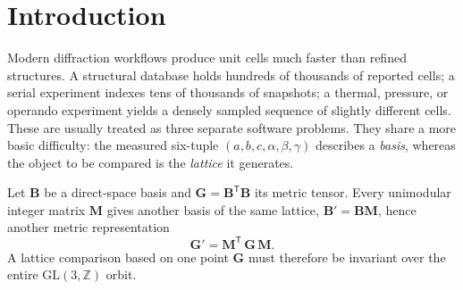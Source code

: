 \documentclass[11pt]{article}
\newcommand{\Gmet}{\mathbf{G}}
\newcommand{\Mop}{\mathbf{M}}
\newcommand{\Bbasis}{\mathbf{B}}
\begin{document}
\section{Introduction}

Modern diffraction workflows produce unit cells much faster than refined
structures. A structural database holds hundreds of thousands of reported cells;
a serial experiment indexes tens of thousands of snapshots; a thermal, pressure,
or operando experiment yields a densely sampled sequence of slightly different
cells. These are usually treated as three separate software problems. They share
a more basic difficulty: the measured six-tuple
$(a, b, c, \alpha, \beta, \gamma)$ describes a \emph{basis}, whereas the object
to be compared is the \emph{lattice} it generates.

Let $\Bbasis$ be a direct-space basis and $\Gmet = \Bbasis^{\mathsf T}\Bbasis$
its metric tensor. Every unimodular integer matrix $\Mop$ gives another basis of
the same lattice, $\Bbasis' = \Bbasis\Mop$, hence another metric representation
\begin{equation}
\Gmet' = \Mop^{\mathsf T}\,\Gmet\,\Mop .
\end{equation}
A lattice comparison based on one point $\Gmet$ must therefore be invariant over
the entire $\mathrm{GL}(3,\mathbb{Z})$ orbit.
\end{document}
